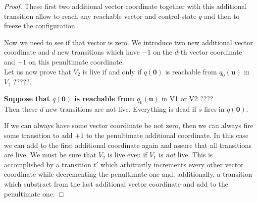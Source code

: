 \begin{proof}
These first two additional vector coordinate together with this additional transition allow
to reach any reachable vector and control-state $q$ and then to freeze the configuration.


Now we need to see if that vector is zero.
We introduce two new additional vector coordinate and $d$ new transitions which have
$-1$ on the $d$-th vector coordinate and $+1$ on this penultimate coordinate. \\


Let us now prove that $V_2$ is live if and only if 
$q(\textbf{0})$
is reachable from $q_0(\textbf{u})$ in $V_1$ ?????.

{\bf Suppose that $q(\textbf{0})$ is reachable from $q_0(\textbf{u})$} in V1 or V2 ????\\
Then these  $d$ new transitions are not live. Everything  is dead if $s$ fires in $q(\textbf{0})$.


If we can always have some vector coordinate be not zero, then we can always fire some transition to add $+1$ to the penultimate additional coordinate.
In this case we can add to the first additional coordinate again and assure that all transitions are live.
We must be sure that $V_2$ is live even if $V_1$ is {\em not} live.
This is accomplished by a transition $t'$  %
which arbitrarily increments every other vector coordinate 
while decrementing the penultimate one and, additionally, a transition which 
substract from the last additional vector coordinate and add to the penultimate one. 


\end{proof}
